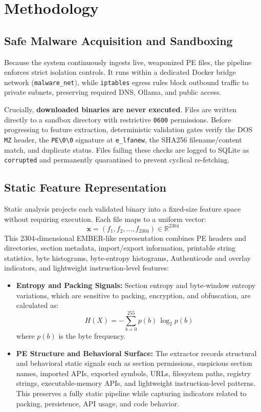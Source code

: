 \documentclass[letterpaper,10pt,conference]{ieeeconf}
\begin{document}
\section{Methodology}

\subsection{Safe Malware Acquisition and Sandboxing}
Because the system continuously ingests live, weaponized PE files, the pipeline enforces strict isolation controls. It runs within a dedicated Docker bridge network (\texttt{malware\_net}), while \texttt{iptables} egress rules block outbound traffic to private subnets, preserving required DNS, Ollama, and public access.

Crucially, \textbf{downloaded binaries are never executed}. Files are written directly to a sandbox directory with restrictive \texttt{0600} permissions. Before progressing to feature extraction, deterministic validation gates verify the DOS \texttt{MZ} header, the \texttt{PE\textbackslash0\textbackslash0} signature at \texttt{e\_lfanew}, the SHA256 filename/content match, and duplicate status. Files failing these checks are logged to SQLite as \texttt{corrupted} and permanently quarantined to prevent cyclical re-fetching.

\subsection{Static Feature Representation}
Static analysis projects each validated binary into a fixed-size feature space without requiring execution. Each file maps to a uniform vector:
\begin{equation}
    \mathbf{x} = (f_1, f_2, \ldots, f_{2304}) \in \mathbb{R}^{2304}
\end{equation}
This 2304-dimensional EMBER-like representation combines PE headers and directories, section metadata, import/export information, printable string statistics, byte histograms, byte-entropy histograms, Authenticode and overlay indicators, and lightweight instruction-level features:
\begin{itemize}
    \item \textbf{Entropy and Packing Signals:} Section entropy and byte-window entropy variations, which are sensitive to packing, encryption, and obfuscation, are calculated as:
    \begin{equation}
        H(X) = -\sum_{b=0}^{255} p(b)\,\log_2 p(b)
    \end{equation}
    where $p(b)$ is the byte frequency.
    \item \textbf{PE Structure and Behavioral Surface:} The extractor records structural and behavioral static signals such as section permissions, suspicious section names, imported APIs, exported symbols, URLs, filesystem paths, registry strings, executable-memory APIs, and lightweight instruction-level patterns. This preserves a fully static pipeline while capturing indicators related to packing, persistence, API usage, and code behavior.
\end{itemize}
\end{document}
